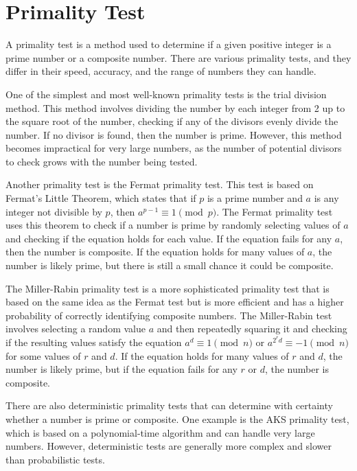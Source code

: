 \documentclass[12pt,openany]{book}
\begin{document}
	\section{Primality Test}
	
	A primality test is a method used to determine if a given positive integer is a prime number or a composite number. There are various primality tests, and they differ in their speed, accuracy, and the range of numbers they can handle.
	
	One of the simplest and most well-known primality tests is the trial division method. This method involves dividing the number by each integer from 2 up to the square root of the number, checking if any of the divisors evenly divide the number. If no divisor is found, then the number is prime. However, this method becomes impractical for very large numbers, as the number of potential divisors to check grows with the number being tested.
	
	Another primality test is the Fermat primality test. This test is based on Fermat's Little Theorem, which states that if $p$ is a prime number and $a$ is any integer not divisible by $p$, then $a^{p-1} \equiv 1 \pmod p$. The Fermat primality test uses this theorem to check if a number is prime by randomly selecting values of $a$ and checking if the equation holds for each value. If the equation fails for any $a$, then the number is composite. If the equation holds for many values of $a$, the number is likely prime, but there is still a small chance it could be composite.
	
	The Miller-Rabin primality test is a more sophisticated primality test that is based on the same idea as the Fermat test but is more efficient and has a higher probability of correctly identifying composite numbers. The Miller-Rabin test involves selecting a random value $a$ and then repeatedly squaring it and checking if the resulting values satisfy the equation $a^{d} \equiv 1 \pmod n$ or $a^{2^rd} \equiv -1 \pmod n$ for some values of $r$ and $d$. If the equation holds for many values of $r$ and $d$, the number is likely prime, but if the equation fails for any $r$ or $d$, the number is composite.
	
	There are also deterministic primality tests that can determine with certainty whether a number is prime or composite. One example is the AKS primality test, which is based on a polynomial-time algorithm and can handle very large numbers. However, deterministic tests are generally more complex and slower than probabilistic tests.
	
\end{document}

